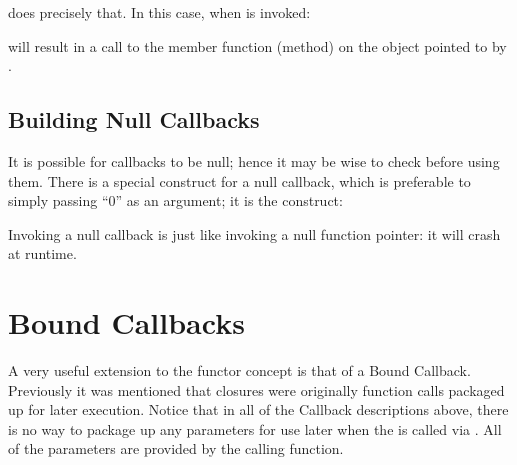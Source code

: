 \documentclass[letterpaper,10pt,english]{sphinxmanual}
\renewcommand{\sphinxcode}[1]{\texttt{\small{#1}}}
\begin{document}
does precisely that.  In this case, when \sphinxcode{} is invoked:

\begin{sphinxVerbatim}[commandchars=\\\{\}]
    
\end{sphinxVerbatim}

will result in a call to the \sphinxcode{} member function (method) on the object
pointed to by \sphinxcode{}.


\subsection{Building Null Callbacks}
\label{\detokenize{callbacks:building-null-callbacks}}
It is possible for callbacks to be null; hence it may be wise to
check before using them.  There is a special construct for a null
callback, which is preferable to simply passing “0” as an argument;
it is the \sphinxcode{\sphinxupquote{MakeNullCallback\textless{}\textgreater{}}} construct:

\begin{sphinxVerbatim}[commandchars=\\\{\}]
    
  
\end{sphinxVerbatim}

Invoking a null callback is just like invoking a null function pointer: it will
crash at runtime.


\section{Bound Callbacks}
\label{\detokenize{callbacks:bound-callbacks}}
A very useful extension to the functor concept is that of a Bound Callback.
Previously it was mentioned that closures were originally function calls
packaged up for later execution.  Notice that in all of the Callback
descriptions above, there is no way to package up any parameters for use
later \textendash{} when the \sphinxcode{} is called via \sphinxcode{}.  All of
the parameters are provided by the calling function.
\end{document}

